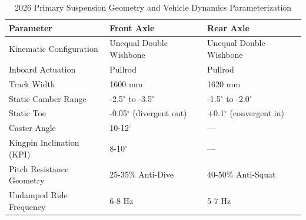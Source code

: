 \begin{table}[H]
\centering
\caption{2026 Primary Suspension Geometry and Vehicle Dynamics Parameterization}
\vspace{0.2cm}
\begin{tabularx}{\textwidth}{@{}lll@{}}
\toprule
\textbf{Parameter} & \textbf{Front Axle} & \textbf{Rear Axle} \\
\midrule
Kinematic Configuration & Unequal Double Wishbone & Unequal Double Wishbone \\
Inboard Actuation & Pullrod & Pullrod \\
Track Width & 1600 mm & 1620 mm \\
Static Camber Range & -2.5$^\circ$ to -3.5$^\circ$ & -1.5$^\circ$ to -2.0$^\circ$ \\
Static Toe & -0.05$^\circ$ (divergent out) & +0.1$^\circ$ (convergent in) \\
Caster Angle & 10-12$^\circ$ & --- \\
Kingpin Inclination (KPI) & 8-10$^\circ$ & --- \\
Pitch Resistance Geometry & 25-35\% Anti-Dive & 40-50\% Anti-Squat \\
Undamped Ride Frequency & 6-8 Hz & 5-7 Hz \\
\bottomrule
\end{tabularx}
\label{tab:suspension_geometry}
\end{table}
